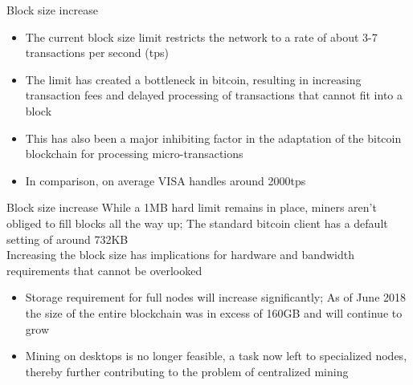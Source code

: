 \documentclass[11pt]{beamer}
\begin{document}

\begin{frame}{Block size increase}
	\begin{itemize}
		\item The current block size limit restricts the network to a rate of about 3-7 transactions per second (tps)
		\item The limit has created a bottleneck in bitcoin, resulting in increasing transaction fees and delayed processing of transactions that cannot fit into a block
		\item This has also been a major inhibiting factor in the adaptation of the bitcoin blockchain for processing micro-transactions
		\item In comparison, on average VISA handles around 2000tps
	\end{itemize}
\end{frame}



\begin{frame}{Block size increase}
	While a 1MB hard limit remains in place, miners aren't obliged to fill blocks all the way up; The standard bitcoin client has a default setting of around 732KB \\\vspace{3mm}
	Increasing the block size has implications for hardware and bandwidth requirements that cannot be overlooked
	\begin{itemize}
		\item Storage requirement for full nodes will increase significantly; As of June 2018 the size of the entire blockchain was in excess of 160GB and will continue to grow
		\item Mining on desktops is no longer feasible, a task now left to specialized nodes, thereby further contributing to the problem of centralized mining
	\end{itemize}
\end{frame}

\end{document}
